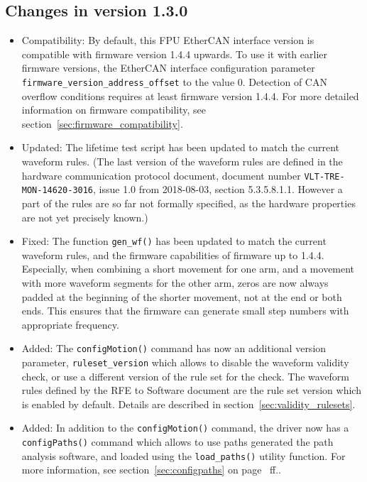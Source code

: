 \documentclass[11pt,a4paper]{report}
\begin{document}
\subsection*{Changes in version 1.3.0}
\begin{itemize}
\item Compatibility: By default, this FPU EtherCAN interface version is compatible
  with firmware version 1.4.4 upwards. To use it with earlier firmware
  versions, the EtherCAN interface configuration parameter
  \texttt{firmware\_version\_address\_offset} to the value
  0. Detection of CAN overflow conditions requires at least firmware
  version 1.4.4. For more detailed information on firmware
  compatibility, see section~\ref{sec:firmware_compatibility}.

\item Updated: The lifetime test script has been updated to match the
  current waveform rules. (The last version of the waveform rules are
  defined in the hardware communication protocol document, document
  number \texttt{VLT-TRE-MON-14620-3016}, issue 1.0 from 2018-08-03,
  section 5.3.5.8.1.1. However a part of the rules are so far not
  formally specified, as the hardware properties are not yet precisely
  known.)

\item Fixed: The function \texttt{gen\_wf()} has been updated
  to match the current waveform rules, and the firmware
  capabilities of firmware up to 1.4.4. Especially, when
  combining a short movement for one arm, and a movement with
  more waveform segments for the other arm, zeros are now
  always padded at the beginning of the shorter movement, not
  at the end or both ends. This ensures that the firmware
  can generate small step numbers with appropriate frequency.
  
  
\item Added: The \texttt{configMotion()} command has now an additional
  version parameter, \texttt{ruleset\_version} which allows to disable
  the waveform validity check, or use a different version of the rule
  set for the check.  The waveform rules defined by the RFE to
  Software document are the rule set version which is enabled by
  default. Details are described in
  section~\ref{sec:validity_rulesets}.

\item Added: In addition to the \texttt{configMotion()} command, the
  driver now has a \texttt{configPaths()} command which allows to use
  paths generated the path analysis software, and loaded using the
  \texttt{load\_paths()} utility function. For more information, see
  section~\ref{sec:configpaths} on page~\pageref{sec:configpaths} ff..


\end{itemize}
\end{document}
